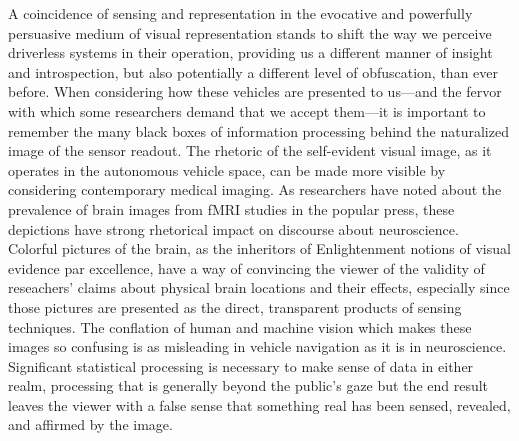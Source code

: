 A coincidence of sensing and representation in the evocative and
powerfully persuasive medium of visual representation stands to shift
the way we perceive driverless systems in their operation, providing
us a different manner of insight and introspection, but also
potentially a different level of obfuscation, than ever before. When
considering how these vehicles are presented to us---and the fervor with
which some researchers demand that we accept them\cite{???}---it is important to
remember the many black boxes of information processing behind the
naturalized image of the sensor readout. The rhetoric of the
self-evident visual image, as it operates in the autonomous vehicle
space, can be made more visible by considering contemporary medical
imaging. As researchers have noted about the prevalence of brain
images from fMRI studies in the popular press, these depictions have
strong rhetorical impact on discourse about neuroscience. Colorful
pictures of the brain, as the inheritors of Enlightenment notions of
visual evidence par excellence, have a way of convincing the viewer of
the validity of reseachers' claims about physical brain locations and
their effects,\cite{???} especially since those pictures are presented as the
direct, transparent products of sensing techniques. The conflation of
human and machine vision which makes these images so confusing is as
misleading in vehicle navigation as it is in neuroscience. Significant
statistical processing is necessary to make sense of data in either
realm, processing that is generally beyond the public's gaze\cite{???} but the
end result leaves the viewer with a false sense that something real
has been sensed, revealed, and affirmed by the image.


